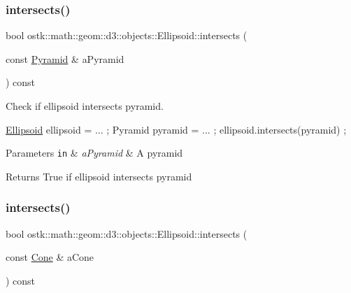 \subsubsection{\texorpdfstring{intersects()}{intersects()}\hspace{0.1cm}{\footnotesize\ttfamily [9/10]}}
{\footnotesize\ttfamily bool ostk\+::math\+::geom\+::d3\+::objects\+::\+Ellipsoid\+::intersects (\begin{DoxyParamCaption}\item[{const \hyperlink{classostk_1_1math_1_1geom_1_1d3_1_1objects_1_1_pyramid}{Pyramid} \&}]{a\+Pyramid }\end{DoxyParamCaption}) const}



Check if ellipsoid intersects pyramid. 


\begin{DoxyCode}
\hyperlink{classostk_1_1math_1_1geom_1_1d3_1_1objects_1_1_ellipsoid_acd84276f65a14db12623402a411712b7}{Ellipsoid} ellipsoid = ... ;
Pyramid pyramid = ... ;
ellipsoid.intersects(pyramid) ;
\end{DoxyCode}



\begin{DoxyParams}[1]{Parameters}
\mbox{\tt in}  & {\em a\+Pyramid} & A pyramid \\
\hline
\end{DoxyParams}
\begin{DoxyReturn}{Returns}
True if ellipsoid intersects pyramid 
\end{DoxyReturn}
\mbox{\label{classostk_1_1math_1_1geom_1_1d3_1_1objects_1_1_ellipsoid_a74c6079e4c8d798892438f9560532f86}} 
\subsubsection{\texorpdfstring{intersects()}{intersects()}\hspace{0.1cm}{\footnotesize\ttfamily [10/10]}}
{\footnotesize\ttfamily bool ostk\+::math\+::geom\+::d3\+::objects\+::\+Ellipsoid\+::intersects (\begin{DoxyParamCaption}\item[{const \hyperlink{classostk_1_1math_1_1geom_1_1d3_1_1objects_1_1_cone}{Cone} \&}]{a\+Cone }\end{DoxyParamCaption}) const}



